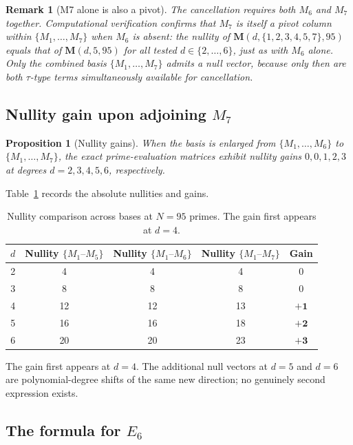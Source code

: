 \documentclass[11pt]{article}
\newtheorem{proposition}[theorem]{Proposition}
\newtheorem{remark}[theorem]{Remark}
\begin{document}
\begin{remark}[M7 alone is also a pivot]
\label{rem:M7-pivot}
The cancellation requires \emph{both} $M_6$ and $M_7$ together.
Computational verification confirms that $M_7$ is itself a pivot column within
$\{M_1,\dots,M_7\}$ when $M_6$ is absent: the nullity of $\mathbf{M}(d,\{1,2,3,4,5,7\},95)$
equals that of $\mathbf{M}(d,5,95)$ for all tested $d\in\{2,\dots,6\}$, just as with $M_6$
alone.
Only the combined basis $\{M_1,\dots,M_7\}$ admits a null vector, because only then are
both $\tau$-type terms simultaneously available for cancellation.
\end{remark}

\subsection{Nullity gain upon adjoining $M_7$}

\begin{proposition}[Nullity gains]
\label{prop:E6-nullity}
When the basis is enlarged from $\{M_1,\dots,M_6\}$ to $\{M_1,\dots,M_7\}$, the exact
prime-evaluation matrices exhibit nullity gains $0,0,1,2,3$ at degrees $d=2,3,4,5,6$,
respectively.
\end{proposition}

Table~\ref{tab:nullity-gains-m7} records the absolute nullities and gains.

\begin{table}[htbp]
\centering
\caption{Nullity comparison across bases at $N=95$ primes. The gain first appears at $d=4$.}
\label{tab:nullity-gains-m7}
\begin{tabular}{@{}ccccc@{}}
\toprule
$d$ & Nullity $\{M_1\text{--}M_5\}$ & Nullity $\{M_1\text{--}M_6\}$ & Nullity $\{M_1\text{--}M_7\}$ & Gain \\
\midrule
2 & 4  & 4  & 4  & 0 \\
3 & 8  & 8  & 8  & 0 \\
4 & 12 & 12 & 13 & $\mathbf{+1}$ \\
5 & 16 & 16 & 18 & $\mathbf{+2}$ \\
6 & 20 & 20 & 23 & $\mathbf{+3}$ \\
\bottomrule
\end{tabular}
\end{table}

The gain first appears at $d=4$.
The additional null vectors at $d=5$ and $d=6$ are polynomial-degree shifts of the same new
direction; no genuinely second expression exists.

\subsection{The formula for $E_6$}
\end{document}
